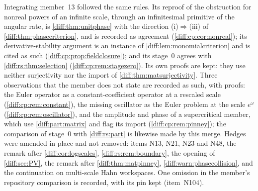 \documentclass[11pt,letterpaper]{article}
\numberwithin{equation}{section}
\theoremstyle{definition}
\theoremstyle{remark}
\begin{document}
\begin{remark}
Integrating member~13 followed the same rules. Its reproof of the obstruction
for nonreal powers of an infinite scale, through an infinitesimal primitive of
the angular rate, is \cref{diff:thm:unitphase} with the direction
(i)$\Rightarrow$(iii) of \cref{diff:thm:phasecriterion}, and is recorded as
agreement (\cref{diff:cp:cor:nonreal}); its derivative-stability argument is an
instance of \cref{diff:lem:monomialcriterion} and is cited as such
(\cref{diff:cp:prop:fieldclosure}); and its stage~$0$ agrees with
\cref{diff:rs:thm:selection} (\cref{diff:cp:rem:stagezero}). Its own proofs are
kept: they use neither surjectivity nor the import of
\cref{diff:thm:matsurjectivity}. Three observations that the member does not
state are recorded as such, with proofs: the Euler operator as a
constant-coefficient operator at a rescaled scale (\cref{diff:cp:rem:constant}),
the missing oscillator as the Euler problem at the scale $e^{\omega}$
(\cref{diff:cp:rem:oscillator}), and the amplitude and phase of a supercritical
member, which use \cref{diff:part:matrix} and flag its import
(\cref{diff:cp:rem:pinney}); the comparison of stage~$0$ with
\cref{diff:rs:part} is likewise made by this merge. Hedges were amended in place
and not removed: items N13, N21, N23 and N48, the remark after
\cref{diff:cor:logscales}, \cref{diff:rs:rem:boundary}, the opening of
\cref{diff:sec:PV}, the remark after \cref{diff:thm:matpinney},
\cref{diff:warn:phasecollision}, and the continuation on multi-scale Hahn
workspaces. One omission in the member's repository comparison is recorded,
with its pin kept (item~N104).


\end{remark}
\end{document}

